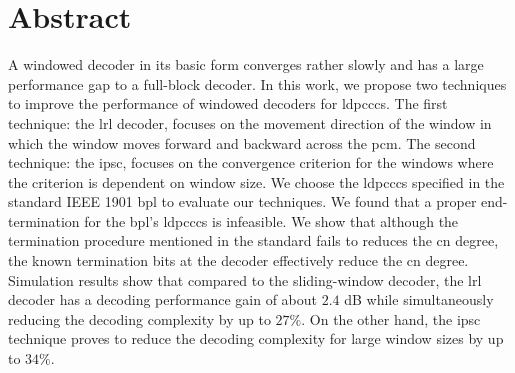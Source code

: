 \chapter*{Abstract}
A windowed decoder in its basic form converges rather slowly and has a large performance gap to a full-block decoder. In this work, we propose two techniques to improve the performance of windowed decoders for \glspl{ldpccc}. The first technique: the \acrshort{lrl} decoder, focuses on the movement direction of the window in which the window moves forward and backward across the \gls{pcm}. The second technique: the \acrshort{ipsc}, focuses on the convergence criterion for the windows where the criterion is dependent on window size. We choose the \glspl{ldpccc} specified in the standard IEEE 1901 \gls{bpl} to evaluate our techniques. We found that a proper end-termination for the \gls{bpl}'s \glspl{ldpccc} is infeasible. We show that although the termination procedure mentioned in the standard fails to reduces the \gls{cn} degree, the known termination bits at the decoder effectively reduce the \gls{cn} degree. Simulation results show that compared to the sliding-window decoder, the \acrshort{lrl} decoder has a decoding performance gain of about $2.4$ dB while simultaneously reducing the decoding complexity by up to $27\%$. On the other hand, the \acrshort{ipsc} technique proves to reduce the decoding complexity for large window sizes by up to $34\%$.